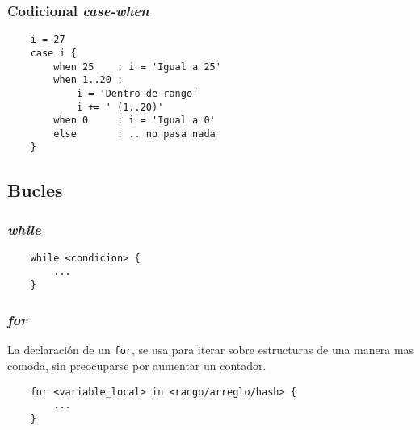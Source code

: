\documentclass[12pt,letterpaper,titlepage,oneside,openright]{book}
\begin{document}
\subsubsection{Codicional \textit{case-when}}

\begin{center}
\begin{minipage}{\linewidth}
\begin{lstlisting}
    i = 27
    case i {
        when 25    : i = 'Igual a 25'
        when 1..20 :
            i = 'Dentro de rango'
            i += ' (1..20)'
        when 0     : i = 'Igual a 0'
        else       : .. no pasa nada
    }
\end{lstlisting}
\end{minipage}
\end{center}

\subsection{Bucles}

\subsubsection{\textit{while}}

\begin{center}
\begin{minipage}{\linewidth}
\begin{lstlisting}
    while <condicion> {
        ...
    }
\end{lstlisting}
\end{minipage}
\end{center}

\subsubsection{\textit{for}}

La declaración de un \texttt{for}, se usa para iterar sobre estructuras de una manera mas comoda, sin preocuparse por aumentar un contador.

\begin{center}
\begin{minipage}{\linewidth}
\begin{lstlisting}
    for <variable_local> in <rango/arreglo/hash> {
        ...
    }
\end{lstlisting}
\end{minipage}
\end{center}
\end{document}
